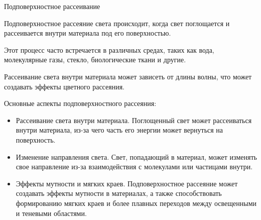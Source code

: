 \documentclass{beamer}
\begin{document}
	\begin{frame}{Подповерхностное рассеивание}

		Подповерхностное рассеяние света происходит, когда свет поглощается и рассеивается внутри материала под его поверхностью. 
		
		Этот процесс часто встречается в различных средах, таких как вода, молекулярные газы, стекло, биологические ткани и другие.
		
    Рассеивание света внутри материала может зависеть от длины волны, что может создавать эффекты цветного рассеяния.

		Основные аспекты подповерхностного рассеяния:
		{\footnotesize
		\begin{itemize}
			\item 
			Рассеивание света внутри материала. Поглощенный свет может рассеиваться внутри материала, из-за чего часть его энергии может вернуться на поверхность.
			\item 
			Изменение направления света. Свет, попадающий в материал, может изменять свое направление из-за взаимодействия с молекулами или частицами внутри.
			\item 
			Эффекты мутности и мягких краев. Подповерхностное рассеяние может создавать эффекты мутности в материалах, а также способствовать формированию мягких краев и более плавных переходов между освещенными и теневыми областями.
		\end{itemize}
		}
		

	\end{frame}
\end{document}
